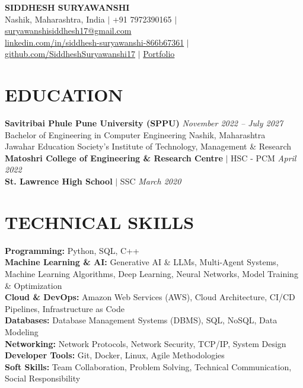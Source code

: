 \documentclass[11pt,a4paper]{article}
\begin{document}
\begin{center}
    {\LARGE \textbf{SIDDHESH SURYAWANSHI}}\\[3pt]
    Nashik, Maharashtra, India $|$ +91 7972390165 $|$
    \href{mailto:suryawanshisiddhesh17@gmail.com}{suryawanshisiddhesh17@gmail.com}\\[1pt]
    \href{https://www.linkedin.com/in/siddhesh-suryawanshi-866b67361}{linkedin.com/in/siddhesh-suryawanshi-866b67361} $|$
    \href{https://github.com/SiddheshSuryawanshi17}{github.com/SiddheshSuryawanshi17} $|$
    \href{https://portfolio-seven-rho-6giumv599g.vercel.app}{Portfolio}
\end{center}

\vspace{-4pt}

\section*{EDUCATION}

\textbf{Savitribai Phule Pune University (SPPU)} \hfill \textit{November 2022 -- July 2027}\\
Bachelor of Engineering in Computer Engineering \hfill Nashik, Maharashtra\\
Jawahar Education Society's Institute of Technology, Management \& Research\\[1pt]
\textbf{Matoshri College of Engineering \& Research Centre} $|$ HSC - PCM \hfill \textit{April 2022}\\
\textbf{St. Lawrence High School} $|$ SSC \hfill \textit{March 2020}

\vspace{1pt}

\section*{TECHNICAL SKILLS}

\textbf{Programming:} Python, SQL, C++\\
\textbf{Machine Learning \& AI:} Generative AI \& LLMs, Multi-Agent Systems, Machine Learning Algorithms, Deep Learning, Neural Networks, Model Training \& Optimization\\
\textbf{Cloud \& DevOps:} Amazon Web Services (AWS), Cloud Architecture, CI/CD Pipelines, Infrastructure as Code\\
\textbf{Databases:} Database Management Systems (DBMS), SQL, NoSQL, Data Modeling\\
\textbf{Networking:} Network Protocols, Network Security, TCP/IP, System Design\\
\textbf{Developer Tools:} Git, Docker, Linux, Agile Methodologies\\
\textbf{Soft Skills:} Team Collaboration, Problem Solving, Technical Communication, Social Responsibility
\end{document}
